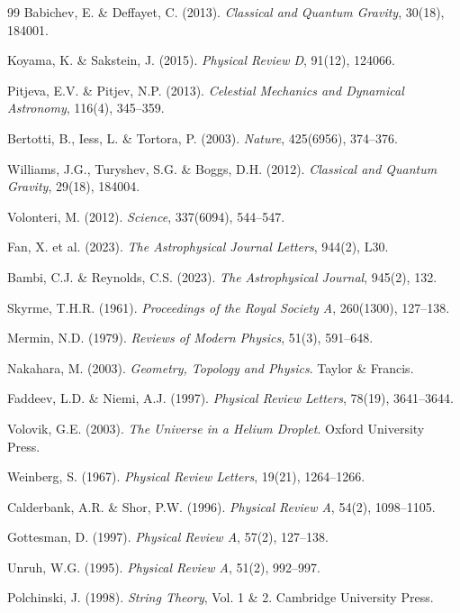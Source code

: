 \documentclass[12pt,a4paper]{book}
\theoremstyle{definition}
\theoremstyle{remark}
\begin{document}
\begin{thebibliography}{99}
 Babichev, E. \& Deffayet, C. (2013). \textit{Classical and Quantum Gravity}, 30(18), 184001.

 Koyama, K. \& Sakstein, J. (2015). \textit{Physical Review D}, 91(12), 124066.

 Pitjeva, E.V. \& Pitjev, N.P. (2013). \textit{Celestial Mechanics and Dynamical Astronomy}, 116(4), 345--359.

 Bertotti, B., Iess, L. \& Tortora, P. (2003). \textit{Nature}, 425(6956), 374--376.

 Williams, J.G., Turyshev, S.G. \& Boggs, D.H. (2012). \textit{Classical and Quantum Gravity}, 29(18), 184004.

 Volonteri, M. (2012). \textit{Science}, 337(6094), 544--547.

 Fan, X. et al. (2023). \textit{The Astrophysical Journal Letters}, 944(2), L30.

 Bambi, C.J. \& Reynolds, C.S. (2023). \textit{The Astrophysical Journal}, 945(2), 132.

 Skyrme, T.H.R. (1961). \textit{Proceedings of the Royal Society A}, 260(1300), 127--138.

 Mermin, N.D. (1979). \textit{Reviews of Modern Physics}, 51(3), 591--648.

 Nakahara, M. (2003). \textit{Geometry, Topology and Physics}. Taylor \& Francis.

 Faddeev, L.D. \& Niemi, A.J. (1997). \textit{Physical Review Letters}, 78(19), 3641--3644.

 Volovik, G.E. (2003). \textit{The Universe in a Helium Droplet}. Oxford University Press.

 Weinberg, S. (1967). \textit{Physical Review Letters}, 19(21), 1264--1266.

 Calderbank, A.R. \& Shor, P.W. (1996). \textit{Physical Review A}, 54(2), 1098--1105.

 Gottesman, D. (1997). \textit{Physical Review A}, 57(2), 127--138.

 Unruh, W.G. (1995). \textit{Physical Review A}, 51(2), 992--997.

 Polchinski, J. (1998). \textit{String Theory}, Vol. 1 \& 2. Cambridge University Press.


\end{thebibliography}
\end{document}
